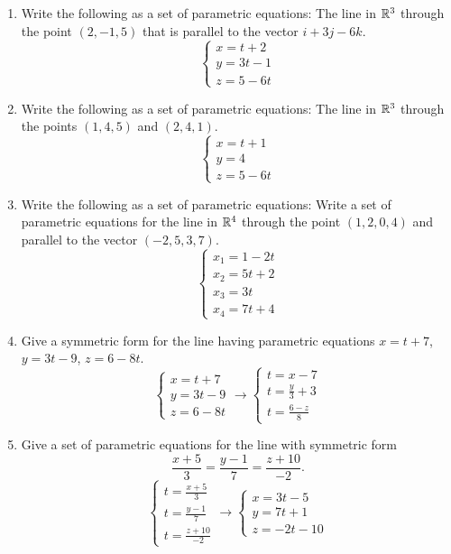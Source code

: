 \documentclass{hw}
\begin{document}
\begin{enumerate}
\item Write the following as a set of parametric equations: The line in $\mathbb{R}^{3}$ through the point $(2,
−1, 5)$ that is parallel to the vector $i + 3j - 6k$.
\[
\begin{cases}
x = t+2\\
y = 3t - 1\\
z = 5 - 6t
\end{cases}
\]
\item Write the following as a set of parametric equations: The line in $\mathbb{R}^{3}$ through the points
$(1,4,5)$ and $(2,4,1)$.
\[
\begin{cases}
x = t + 1\\
y = 4\\
z = 5 - 6t
\end{cases}
\]
\item Write the following as a set of parametric equations: Write a set of parametric equations for the
line in $\mathbb{R}^{4}$ through the point $(1, 2, 0, 4)$ and parallel to the vector $(−2, 5, 3, 7)$.
\[
\begin{cases}
x_{1} =1-2t\\
x_{2} =5t+2\\
x_{3} =3t\\
x_{4} =7t+4
\end{cases}
\]

\item Give a symmetric form for the line having parametric equations $x = t + 7$, $y = 3t - 9$, $z = 6 -
8t$.
\[
\begin{cases}
x = t + 7\\
y = 3t - 9\\
z = 6-8t
\end{cases}\to
\begin{cases}
t = x - 7\\
t = \frac{y}{3} + 3\\
t = \frac{6 - z}{8}
\end{cases}
\]

\item Give a set of parametric equations for the line with symmetric form
\[
\frac{x + 5}{3} = \frac{y - 1}{7} = \frac{z + 10}{-2}.
\]
\[
\begin{cases}
t = \frac{x + 5}{3}\\
t = \frac{y - 1}{7}\\
t = \frac{z + 10}{-2}
\end{cases}\to
\begin{cases}
x = 3t - 5\\
y = 7t + 1\\
z = -2t -10
\end{cases}
\]


\end{enumerate}
\end{document}

